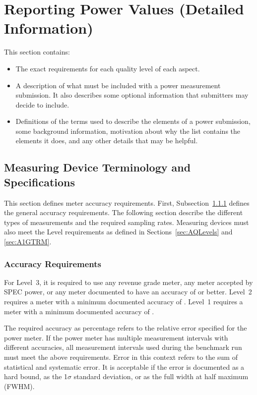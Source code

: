 \chapter{Reporting Power Values \normalsize{(Detailed Information)}}
\label{sec:reporting}

This section contains:
\begin{itemize}
 \item The exact requirements for each quality level of each aspect.
 \item A description of what must be included with a power measurement submission.
       It also describes some optional information that submitters may decide to include.
 \item Definitions of the terms used to describe the elements of a power submission, some background information, motivation about why the list contains the elements it does, and any other details that may be helpful.
\end{itemize}

\section{Measuring Device Terminology and Specifications}
\label{sec:MDSpecs}
\label{sec:MDTerm}

This section defines meter accuracy requirements.
First, Subsection~\ref{sec:accuracy} defines the general accuracy requirements.
The following section describe the different types of measurements and the required sampling rates. 
Measuring devices must also meet the Level requirements as defined in Sections~\ref{sec:AQLevels} and \ref{sec:A1GTRM}.

\subsection{Accuracy Requirements}
\label{sec:accuracy}

For Level~3, it is required to use any revenue grade meter, any meter accepted by SPEC power, or any meter documented to have an accuracy of \SpecAccuracyLThree{} or better.
Level~2 requires a meter with a minimum documented accuracy of \SpecAccuracyLTwo{}.
Level~1 requires a meter with a minimum documented accuracy of \SpecAccuracyLOne{}.

The required accuracy as percentage refers to the relative error specified for the power meter.
If the power meter has multiple measurement intervals with different accuracies, all measurement intervals used during the benchmark run must meet the above requirements.
Error in this context refers to the sum of statistical and systematic error.
It is acceptable if the error is documented as a hard bound, as the 1$\sigma$ standard deviation, or as the full width at half maximum (FWHM).

